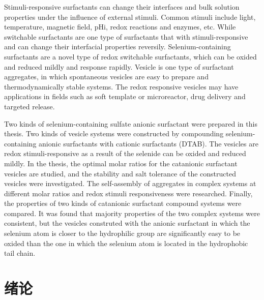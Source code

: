 \documentclass[bachelor,winfonts,replaceperiod]{jnuthesis}
\begin{document}
    \begin{englishabstract}
        Stimuli-responsive surfactants can change their interfaces and bulk solution properties under the influence of external stimuli.
        Common stimuli include light, temperature, magnetic field, pHi, redox reactions and enzymes, etc. While switchable surfactants
        are one type of surfactants that with stimuli-responsive and can change their interfacial properties reversily. Selenium-containing surfactants are a novel type of redox switchable surfactants, which can be oxided and reduced mildly and response rapidly. 
        Vesicle is  one type of surfactant aggregates,  in which spontaneous vesicles are easy to prepare and thermodynamically stable
        systems. The redox responsive vesicles may have applications in fields such as soft template or microreactor, drug delivery
        and targeted release.
        
        Two kinds of selenium-containing sulfate anionic surfactant were prepared in this thesis. Two kinds of vesicle systems were
        constructed by compounding selenium-containing anionic surfactants with cationic surfactants (DTAB). The vesicles are redox
        stimuli-responsive as a result of the selenide can be oxided and reduced mildly. In the thesis, the optimal molar ratios for the 
        catanionic surfactant vesicles are studied, and the stability and salt tolerance of the constructed vesicles were investigated.
        The self-assembly of aggregates in complex systems at different molar ratios and  redox stimuli responsiveness were researched. 
        Finally, the properties of two kinds of catanionic surfactant compound systems were compared. It was found that majority properties
        of the two complex systems were consistent, but the vesicles construted with the anionic surfactant in which the selenium atom is 
        closer to the hydrophilic group are significantly easy  to be oxided than the one in which the selenium atom is located in the 
        hydrophobic tail chain.
    \end{englishabstract}
    
    \tableofcontents
    
    \mainmatter
    
    \chapter{绪论}\label{chapter:introduction}
\end{document}

